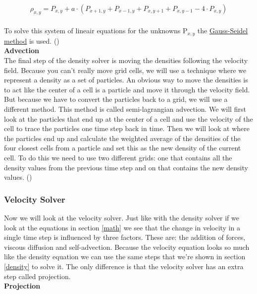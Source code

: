 \documentclass[a4paper,12pt]{article}
\begin{document}
\[
\begin{array}{ll}
	\rho_{x, y} = P_{x, y} + a \cdot (P_{x+1, y} + P_{x-1, y} + P_{x, y+1} + P_{x, y-1} - 4 \cdot P_{x, y})
\end{array}	
\] \\

To solve this system of lineair equations for the unknowns P$_{x, y}$ the \hyperlink{https://en.wikipedia.org/wiki/Gauss–Seidel_method}{Gauss-Seidel method} is used. 
(\cite{josstam}) \\

\textbf{Advection }\\

The final step of the density solver is moving the densities following the velocity field.
Because you can't really move grid cells, we will use a technique where we represent a density as a set of particles.
An obvious way to move the densities is to act like the center of a cell is a particle and move it through the velocity field.
But because we have to convert the particles back to a grid, we will use a different method. 
This method is called semi-lagrangian advection.
We will first look at the particles that end up at the center of a cell and use the velocity of the cell to trace the particles one time step back in time.
Then we will look at where the particles end up and calculate the weighted average of the densities of the four closest cells from a particle and set this as the new density of the current cell. 
To do this we need to use two different grids: one that contains all the density values from the previous time step
and on that contains the new density values. (\cite{josstam})

 \subsubsection{Velocity Solver}
Now we will look at the velocity solver. Just like with the density solver if we look at the equations in section \ref{math}
we see that the change in velocity in a single time step is influenced by three factors. 
These are: the addition of forces, viscous diffusion and self-advection. 
Because the velocity equation looks so much like the density equation we can use the same steps that we're shown in section \ref{density} to solve it.
The only difference is that the velocity solver has an extra step called projection. \\

\textbf{Projection }\\
\end{document}
